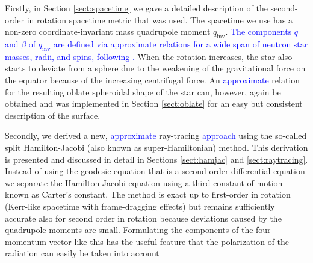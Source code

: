 \documentclass{aa}
\newcommand{\refe}[1]{\textcolor{blue}{{#1}}}
\newcommand{\qinv}{\ensuremath{q_{\mathrm{inv}}}}
\begin{document}
Firstly, in Section \ref{sect:spacetime} we gave a detailed description of the second-order in rotation spacetime metric that was used.
The spacetime we use has a non-zero coordinate-invariant mass quadrupole moment $\qinv$. 
\refe{The components $q$ and $\beta$ of $\qinv$ are defined via approximate relations for a wide span of neutron star masses, radii, and spins, following \citet{aGM14}.}
When the rotation increases, the star also starts to deviate from a sphere due to the weakening of the gravitational force on the equator because of the increasing centrifugal force.
An \refe{approximate} relation for the resulting oblate spheroidal shape of the star can, however, again be obtained \citep{MLC07, aGM14} and was implemented in Section \ref{sect:oblate} for an easy but consistent description of the surface.

Secondly, we derived a new, \refe{approximate} ray-tracing \refe{approach} using the so-called split Hamilton-Jacobi (also known as super-Hamiltonian) method.
This derivation is presented and discussed in detail in Sections \ref{sect:hamjac} and \ref{sect:raytracing}.
Instead of using the geodesic equation that is a second-order differential equation we separate the Hamilton-Jacobi equation using a third constant of motion known as Carter's constant.
The method is exact up to first-order in rotation (Kerr-like spacetime with frame-dragging effects) but remains sufficiently accurate also for second order in rotation because deviations caused by the quadrupole moments are small.
Formulating the components of the four-momentum vector like this has the useful feature that the polarization of the radiation can easily be taken into account \citep[see e.g.][]{cha, dexter2016}
\end{document}

